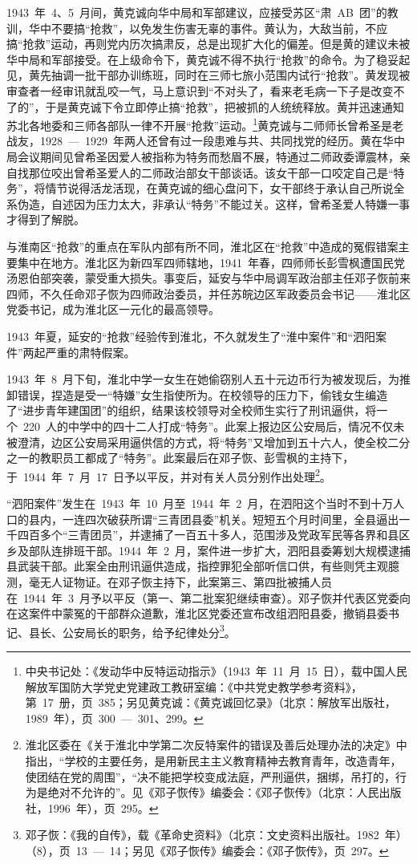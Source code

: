 1943~年~4、5~月间，黄克诚向华中局和军部建议，应接受苏区“肃~AB~团”的教训，华中不要搞“抢救”，以免发生伤害无辜的事件。黄认为，大敌当前，不应搞“抢救”运动，再则党内历次搞肃反，总是出现扩大化的偏差。但是黄的建议未被华中局和军部接受。在上级命令下，黄克诚不得不执行“抢救”的命令。为了稳妥起见，黄先抽调一批干部办训练班，同时在三师七旅小范围内试行“抢救”。黄发现被审查者一经审讯就乱咬一气，马上意识到“不对头了，看来老毛病一下子是改变不了的”，于是黄克诚下令立即停止搞“抢救”，把被抓的人统统释放。黄并迅速通知苏北各地委和三师各部队一律不开展“抢救”运动。\footnote{中央书记处：《发动华中反特运动指示》（1943~年~11~月~15~日），载中国人民解放军国防大学党史党建政工教研室编：《中共党史教学参考资料》，第~17~册，页~385；另见黄克诚：《黄克诚回忆录》（北京：解放军出版社，1989~年），页~300~—~301、299。}黄克诚与二师师长曾希圣是老战友，1928~—~1929~年两人还曾有过一段患难与共、共同找党的经历。黄在华中局会议期间见曾希圣因爱人被指称为特务而愁眉不展，特通过二师政委谭震林，亲自找那位咬出曾希圣爱人的二师政治部女干部谈话。该女干部一口咬定自己是“特务”，将情节说得活龙活现，在黄克诚的细心盘问下，女干部终于承认自己所说全系伪造，自述因为压力太大，非承认“特务”不能过关。这样，曾希圣爱人特嫌一事才得到了解脱。

与淮南区“抢救”的重点在军队内部有所不同，淮北区在“抢救”中造成的冤假错案主要集中在地方。淮北区为新四军四师辖地，1941~年春，四师师长彭雪枫遭国民党汤恩伯部突袭，蒙受重大损失。事变后，延安与华中局调军政治部主任邓子恢前来四师，不久任命邓子恢为四师政治委员，并任苏皖边区军政委员会书记——淮北区党委书记，成为淮北区一元化的最高领导。

1943~年夏，延安的“抢救”经验传到淮北，不久就发生了“淮中案件”和“泗阳案件”两起严重的肃特假案。

1943~年~8~月下旬，淮北中学一女生在她偷窃别人五十元边币行为被发现后，为推卸错误，捏造是受一“特嫌”女生指使所为。在校领导的压力下，偷钱女生编造了“进步青年建国团”的组织，结果该校领导对全校师生实行了刑讯逼供，将一个~220~人的中学中的四十二人打成“特务”。此案上报边区公安局后，情况不仅未被澄清，边区公安局采用逼供信的方式，将“特务”又增加到五十六人，使全校二分之一的教职员工都成了“特务”。此案最后在邓子恢、彭雪枫的主持下，于~1944~年~7~月~17~日予以平反，并对有关人员分别作出处理\footnote{淮北区委在《关于淮北中学第二次反特案件的错误及善后处理办法的决定》中指出，“学校的主要任务，是用新民主主义教育精神去教育青年，改造青年，使团结在党的周围”，“决不能把学校变成法庭，严刑逼供，捆绑，吊打的，行为是绝对不允许的”。见《邓子恢传》编委会：《邓子恢传》（北京：人民出版社，1996~年），页~295。}。

“泗阳案件”发生在~1943~年~10~月至~1944~年~2~月，在泗阳这个当时不到十万人口的县内，一连四次破获所谓“三青团县委”机关。短短五个月时间里，全县逼出一千四百多个“三青团员”，并逮捕了一百五十多人，范围涉及党政军民等各界和县区乡及部队连排班干部。1944~年~2~月，案件进一步扩大，泗阳县委筹划大规模逮捕县武装干部。此案全由刑讯逼供造成，指控罪犯全部听信口供，有些则凭主观臆测，毫无人证物证。在邓子恢主持下，此案第三、第四批被捕人员在~1944~年~3~月予以平反（第一、第二批案犯继续审查）。邓子恢并代表区党委向在这案件中蒙冤的干部群众道歉，淮北区党委还宣布改组泗阳县委，撤销县委书记、县长、公安局长的职务，给予纪律处分\footnote{邓子恢：《我的自传》，载《革命史资料》（北京：文史资料出版社。1982~年）（8），页~13~—~14；另见《邓子恢传》编委会：《邓子恢传》，页~297。}。


